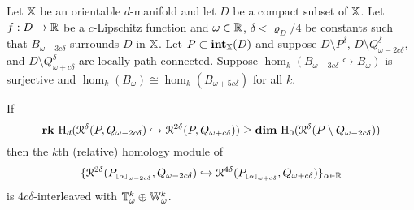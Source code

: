 \begin{theorem}\label{thm:main}
  Let $\mathbb{X}$ be an orientable $d$-manifold and let $D$ be a compact subset of $\mathbb{X}$.
  Let $f : D\to\mathbb{R}$ be a $c$-Lipschitz function and $\omega\in\mathbb{R}$, $\delta < \varrho_D/4$ be constants such that $B_{\omega-3c\delta}$ surrounds $D$ in $\mathbb{X}$.
  Let $P\subset \mathbf{int}_{\mathbb{X}}(D)$ and suppose $D\setminus P^\delta$, $D\setminus Q_{\omega-2c\delta}^\delta$, and $D\setminus Q_{\omega+c\delta}^\delta$ are locally path connected.
  Suppose $\hom_k(B_{\omega-3c\delta}\hookrightarrow B_\omega)$ is surjective and $\hom_k(B_\omega)\cong\hom_k(B_{\omega+5c\delta})$ for all $k$.

  If
    \[\mathbf{rk}~\mathrm{H}_d(\mathcal{R}^\delta(P, Q_{\omega - 2c\delta})\hookrightarrow \mathcal{R}^{2\delta}(P, Q_{\omega+c\delta})) \geq \mathbf{dim}~\mathrm{H}_0(\mathcal{R}^\delta(P\setminus Q_{\omega-2c\delta}))\]
  then the $k$th (relative) homology module of
  \[\{\mathcal{R}^{2\delta}(P_{\scriptscriptstyle \lfloor\alpha\rfloor_{\omega-2c\delta}}, Q_{\omega-2c\delta})\hookrightarrow \mathcal{R}^{4\delta}(P_{\scriptscriptstyle \lfloor\alpha\rfloor_{\omega+c\delta}}, Q_{\omega+c\delta})\}_{\alpha\in\mathbb{R}}\]
  is $4c\delta$-interleaved with $\mathbb{T}_{\omega}^k \oplus \mathbb{W}_\omega^k$.
\end{theorem}
